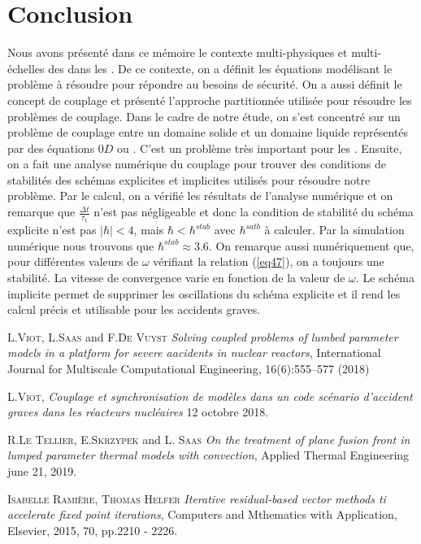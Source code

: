 \documentclass[11pt,a4paper]{scrartcl}%
\newcommand{\va}[1]{\left\lvert#1\right\rvert}%
\begin{document}
	\section{Conclusion}
	Nous avons présenté dans ce mémoire le contexte multi-physiques et multi-échelles des  dans les . De ce contexte, on a définit les équations modélisant le problème à résoudre pour répondre au besoins de sécurité. On a aussi définit le concept de couplage et présenté l'approche partitionnée utilisée pour résoudre les problèmes de couplage. Dans le cadre de notre étude, on s'est concentré sur un problème de couplage entre un domaine solide et un domaine liquide représentés par des équations $0D$ ou . C'est un problème très important pour les . Ensuite, on a fait une analyse numérique du couplage pour trouver des conditions de stabilités des schémas explicites et implicites utilisés pour résoudre notre problème. Par le calcul, on a vérifié les résultats de l'analyse numérique  et  on remarque que $\frac{\Delta t}{\tau_1}$ n'est pas négligeable et donc la condition de stabilité du schéma explicite n'est pas $\va{\hbar}<4$, mais $\hbar<\hbar^{stab}$ avec $\hbar^{satb}$ à calculer. Par la simulation numérique nous trouvons que $\hbar^{stab}\approx 3.6$. On remarque aussi numériquement que, pour différentes valeurs de $\omega$ vérifiant la relation (\ref{eq47}), on a toujours une stabilité. La vitesse de convergence varie en fonction de la valeur de $\omega$. Le schéma implicite permet de supprimer les oscillations du schéma explicite et il rend les calcul précis et utilisable pour les accidents graves.   
	\newpage	
	\begin{thebibliography}{1}
		  \textsc{L.Viot}, \textsc{L.Saas} and \textsc{F.De Vuyst} \textit{Solving coupled problems of lumbed parameter models in a platform for severe aacidents in nuclear reactors}, International Journal for Multiscale Computational Engineering, 16(6):555–577 (2018)
		
		  \textsc{L.Viot}, \textit{ Couplage et synchronisation de modèles dans un code scénario d'accident graves dans les réacteurs nucléaires} 12 octobre 2018.
		
		  \textsc{R.Le Tellier}, \textsc{E.Skrzypek} and \textsc{L. Saas} \textit{On the treatment of plane fusion front in lumped parameter thermal models with convection}, Applied Thermal Engineering june 21, 2019.
		
		  \textsc{Isabelle Ramière}, \textsc{Thomas Helfer} \textit{Iterative residual-based vector methods ti accelerate fixed point iterations}, Computers and Mthematics with Application, Elsevier, 2015, 70, pp.2210 - 2226.
		
	\end{thebibliography} 	  
  
\end{document}
